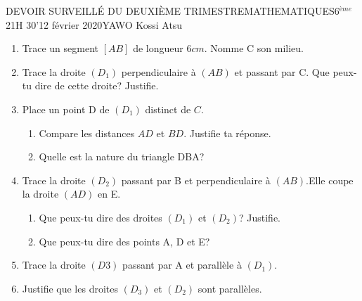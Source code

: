 \documentclass[12pt,a4paper]{book}
\newcommand{\prof}{YAWO Kossi Atsu}
\newcommand{\matiere}{MATHEMATIQUES}
\newcommand{\classe}{6$^{ème}$}
\begin{document}
\begin{devoir}{DEVOIR SURVEILLÉ DU DEUXIÈME TRIMESTRE}{\matiere}{\classe}{2}{1H 30'}{12 février 2020}{\prof}
\vspace{1cm}

\begin{exo}[6]
\begin{enumerate}
\item Trace un segment $[AB]$ de longueur $6cm$. Nomme C son milieu.
\item Trace la droite $(D_1)$ perpendiculaire à $(AB)$ et passant par C. Que peux-tu dire de cette droite? Justifie.
\item Place un point D de $(D_1)$ distinct de $C$.
\begin{enumerate}
\item Compare les distances $AD$ et $BD$. Justifie ta réponse.
\item Quelle est la nature du triangle DBA?
\end{enumerate}
\item Trace la droite $(D_2)$ passant par B et perpendiculaire à $(AB)$.Elle coupe la droite $(AD)$ en E.
\begin{enumerate}
\item Que peux-tu dire des droites $(D_1)$ et $(D_2)$? Justifie.
\item Que peux-tu dire des points A, D et E?
\end{enumerate} 
\item Trace la droite $(D3)$ passant par A et parallèle à $(D_1)$.
\item Justifie que les droites $(D_3)$ et $(D_2)$ sont parallèles.
\end{enumerate} 
\end{exo}
\end{devoir}


\vspace{0.5cm}
\end{document}
